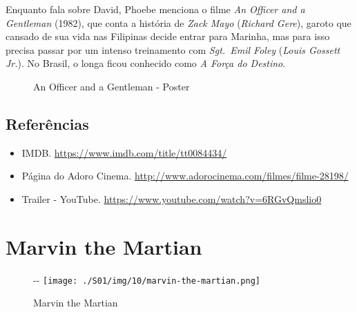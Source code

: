 Enquanto fala sobre David, Phoebe menciona o filme \emph{An Officer and
a Gentleman} (1982), que conta a história de \emph{Zack Mayo}
(\emph{Richard Gere}), garoto que cansado de sua vida nas Filipinas
decide entrar para Marinha, mas para isso precisa passar por um intenso
treinamento com \emph{Sgt.~Emil Foley} (\emph{Louis Gossett Jr.}). No
Brasil, o longa ficou conhecido como \emph{A Força do Destino}.

\begin{figure}
  \centering
    \caption{An Officer and a Gentleman - Poster\label{fig:an-officer-and-a-gentleman-poster}}
\end{figure}

\hypertarget{referuxeancias-1}{%
\subsection{Referências}\label{referuxeancias-1}}

\begin{itemize}
\tightlist
\item
  \sloppy IMDB. \url{https://www.imdb.com/title/tt0084434/}
\item
  \sloppy Página do Adoro Cinema. \url{http://www.adorocinema.com/filmes/filme-28198/}
\item
  \sloppy Trailer - YouTube. \url{https://www.youtube.com/watch?v=6RGvQmslio0}
\end{itemize}

\hypertarget{marvin-the-martian}{%
\section{Marvin the Martian}\label{marvin-the-martian}}

\begin{figure}[!ht]
  \begin{adjustwidth}{-\oddsidemargin-1in}{-\rightmargin}
    \centering
    \texttt{[image: ./S01/img/10/marvin-the-martian.png]}
    \caption{Marvin the Martian\label{fig:marvin-the-martian}}
  \end{adjustwidth}
\end{figure}

